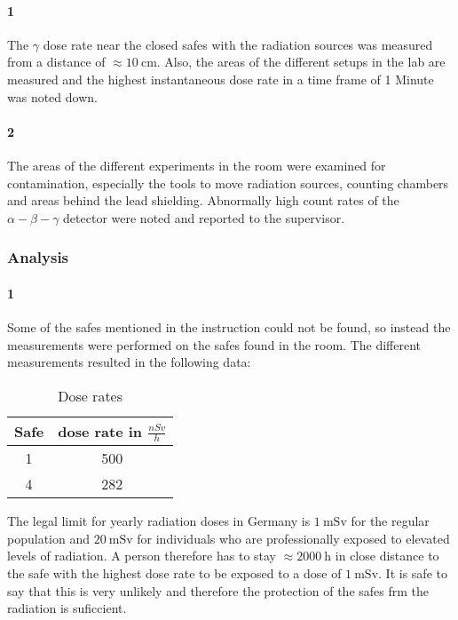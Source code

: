 \documentclass[12pt,twoside,a4paper]{scrartcl}
\begin{document}
		\paragraph{1}
		The $\gamma$ dose rate near the closed safes with the radiation sources was measured from a distance of $\approx \SI{10}{\centi \metre}$.
		Also, the areas of the different setups in the lab are measured and the highest instantaneous dose rate in a time frame of 1 Minute was noted down.

		\paragraph{2}
			The areas of the different experiments in the room were examined for contamination, especially the tools to move radiation sources, counting chambers and areas behind the lead shielding. Abnormally high count rates of the $\alpha - \beta - \gamma$ detector were noted and reported to the supervisor.

	\subsubsection{Analysis}
		\paragraph{1}

			Some of the safes mentioned in the instruction could not be found, so instead the measurements were performed on the safes found in the room.
			The different measurements resulted in the following data:

			\begin{table}[H]
				\centering
				\caption{Dose rates}
				\label{Dose::safes}
				\begin{tabular}{|c|c|}
					\hline
					Safe & dose rate in $\frac{nSv}{h}$ \\
					\hline
					1		&		500 \\
					4		&		282 \\
					\hline
				\end{tabular}
			\end{table}

			The legal limit for yearly radiation doses in Germany is $\SI{1}{\milli \sievert}$ for the regular population and $\SI{20}{\milli \sievert}$ for individuals who are professionally exposed to elevated levels of radiation. A person therefore has to stay $\approx \SI{2000}{\hour}$ in close distance to the safe with the highest dose rate to be exposed to a dose of $\SI{1}{\milli \sievert}$. It is safe to say that this is very unlikely and therefore the protection of the safes frm the radiation is suficcient.
\end{document}
